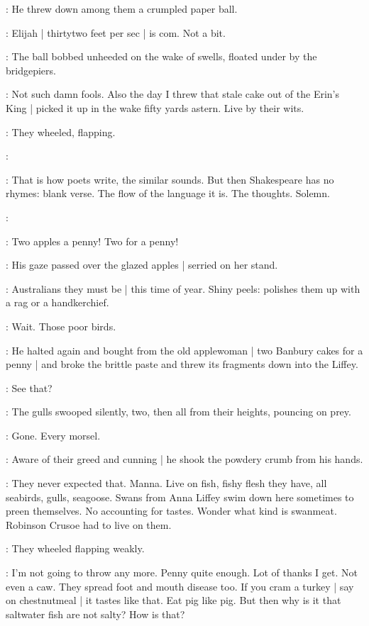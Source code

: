 :
He threw down among them a crumpled paper ball.

\BloomInt:
Elijah |
thirtytwo feet per sec |
is com.
Not a bit.

:
The ball bobbed unheeded on the wake of swells,
floated under by the bridgepiers.

\BloomInt:
Not such damn fools.
Also the day I threw that stale cake out of the Erin's King |
picked it up in the wake fifty yards astern.
Live by their wits.

:
They wheeled,
flapping.

\BloomInt:

\BloomInt:
That is how poets write, the similar sounds.
But then Shakespeare has no rhymes:
blank verse.
The flow of the language it is.
The thoughts.
Solemn.

\BloomInt:

:
Two apples a penny!
Two for a penny!

:
His gaze passed over the glazed apples |
serried on her stand.

\BloomInt:
Australians they must be |
this time of year.
Shiny peels:
polishes them up
with a rag or a handkerchief.

\BloomInt:
Wait.
Those poor birds.

:
He halted again and bought from the old applewoman |
two Banbury cakes for a penny |
and broke the brittle paste
and threw its fragments down into the Liffey.

\BloomInt:
See that?

:
The gulls swooped silently,
two,
then all from their heights,
pouncing on prey.

\BloomInt:
Gone.
Every morsel.

:
Aware of their greed and cunning |
he shook the powdery crumb from his hands.

\BloomInt:
They never expected that.
Manna.
Live on fish,
fishy flesh they have,
all seabirds,
gulls,
seagoose.
Swans from Anna Liffey swim down here sometimes
to preen themselves.
No accounting for tastes.
Wonder what kind is swanmeat.
Robinson Crusoe had to live on them.

:
They wheeled flapping weakly.

\BloomInt:
I'm not going to throw any more.
Penny quite enough.
Lot of thanks I get.
Not even a caw.
They spread foot and mouth disease too.
If you cram a turkey |
say on chestnutmeal |
it tastes like that.
Eat pig like pig.
But then why is it that saltwater fish are not salty?
How is that?

